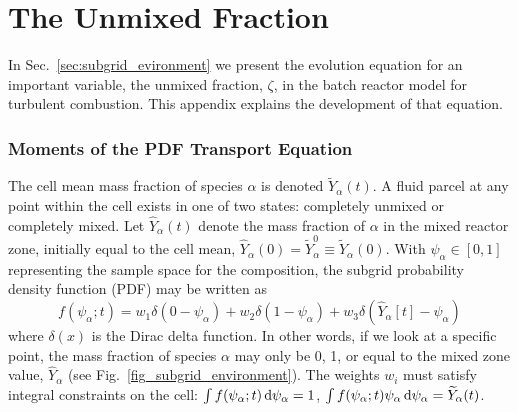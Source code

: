 \chapter{The Unmixed Fraction}
\label{app:unmixed_fraction}

In Sec.~\ref{sec:subgrid_evironment} we present the evolution equation for an important variable, the unmixed fraction, $\zeta$, in the batch reactor model for turbulent combustion.  This appendix explains the development of that equation.

\subsection*{Moments of the PDF Transport Equation}
\label{app:pdf_transport}

The cell mean mass fraction of species $\alpha$ is denoted $\widetilde{Y}_\alpha(t)$. A fluid parcel at any point within the cell exists in one of two states: completely unmixed or completely mixed.  Let $\hat{Y}_\alpha(t)$ denote the mass fraction of $\alpha$ in the mixed reactor zone, initially equal to the cell mean, $\hat{Y}_\alpha(0) = \widetilde{Y}_{\alpha}^0 \equiv \widetilde{Y}_{\alpha}(0)$.  With $\psi_\alpha \in [0,1]$ representing the sample space for the composition, the subgrid probability density function (PDF) may be written as
\begin{equation}
\label{eq:pdf}
f(\psi_\alpha;t) = w_1 \delta(0-\psi_\alpha) + w_2 \delta(1-\psi_\alpha) + w_3 \delta(\hat{Y}_\alpha[t] - \psi_\alpha)
\end{equation}
where $\delta(x)$ is the Dirac delta function.  In other words, if we look at a specific point, the mass fraction of species $\alpha$ may only be 0, 1, or equal to the mixed zone value, $\hat{Y}_\alpha$ (see Fig.~\ref{fig_subgrid_environment}).  The weights $w_i$ must satisfy integral constraints on the cell: $\int f(\psi_\alpha;t) \,\mathrm{d} \psi_\alpha = 1$, $\int f(\psi_\alpha;t) \psi_\alpha \,\mathrm{d} \psi_\alpha = \widetilde{Y}_\alpha(t)$.

